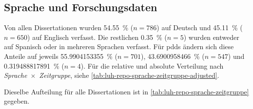 \subsection{Sprache und Forschungsdaten}\label{sec:luh-repo-results-language}
Von allen Dissertationen wurden \SI[round-mode=places,round-precision=2]{54.55}{\percent} ($n=\num{786}$) auf Deutsch und \SI[round-mode=places,round-precision=2]{45,11}{\percent} ($n=\num{650}$) auf Englisch verfasst.
Die restlichen \SI[round-mode=places,round-precision=2]{0.35}{\percent} ($n=\num{5}$) wurden entweder auf Spanisch oder in mehreren Sprachen verfasst.
Für \glspl{pdd} ändern sich diese Anteile auf jeweils \SI[round-mode=places,round-precision=2]{55.9904153355}{\percent} ($n=\num{701}$), \SI[round-mode=places,round-precision=2]{43.6900958466}{\percent} ($n=\num{547}$) und \SI[round-mode=places,round-precision=2]{0.319488817891}{\percent} ($n=\num{4}$).
Für die relative und absolute Verteilung nach \textit{Sprache}~$\times$~\textit{Zeitgruppe}, siehe \cref{tab:luh-repo-sprache-zeitgruppe-adjusted}.
\begin{table}[!htbp]
	\caption{\gls{forschungsdaten}-Klassifizierung der \glspl{pdd} aus der Stichprobe nach \textit{Sprache}~$\times$~\textit{Zeitgruppe} aufgegliedert.
    Angaben relativ zu der Gesamtanzahl der jeweiligen Zeitgruppe.
    Absolute Werte in Klammern angegeben.}
    
    \label{tab:luh-repo-sprache-zeitgruppe-adjusted}
\end{table}
Dieselbe Aufteilung für alle Dissertationen ist in \cref{tab:luh-repo-sprache-zeitgruppe} gegeben.

